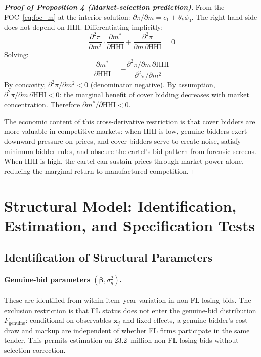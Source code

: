 \begin{proof}[\textbf{Proof of Proposition 4 (Market-selection prediction)}]
From the FOC~\eqref{eq:foc_m} at the interior solution:
$\partial \pi / \partial m = c_1 + \theta_k \phi_0$. The right-hand
side does not depend on HHI. Differentiating implicitly:
\[
  \frac{\partial^2 \pi}{\partial m^2} \cdot
  \frac{\partial m^*}{\partial \text{HHI}}
  + \frac{\partial^2 \pi}{\partial m \, \partial \text{HHI}} = 0
\]
Solving:
\[
  \frac{\partial m^*}{\partial \text{HHI}} =
  -\frac{\partial^2 \pi / \partial m \, \partial \text{HHI}}
  {\partial^2 \pi / \partial m^2}
\]
By concavity, $\partial^2 \pi / \partial m^2 < 0$ (denominator negative).
By assumption, $\partial^2 \pi / \partial m \, \partial \text{HHI} < 0$:
the marginal benefit of cover bidding decreases with market
concentration. Therefore $\partial m^* / \partial \text{HHI} < 0$.

The economic content of this cross-derivative restriction is that cover bidders
are more valuable in competitive markets: when HHI is low, genuine
bidders exert downward pressure on prices, and cover bidders serve to
create noise, satisfy minimum-bidder rules, and obscure the cartel's
bid pattern from forensic screens. When HHI is high, the cartel can
sustain prices through market power alone, reducing the marginal return
to manufactured competition.
\end{proof}


\section{Structural Model: Identification, Estimation, and Specification Tests}
\label{app:structural_id}

\subsection{Identification of Structural Parameters}

\paragraph{Genuine-bid parameters $(\boldsymbol{\beta}, \sigma_g^2)$.}
These are identified from within-item--year variation in non-FL
losing bids. The exclusion restriction is that FL status does not
enter the genuine-bid distribution $F_{\text{genuine}}$: conditional
on observables $\mathbf{x}_j$ and fixed effects, a genuine bidder's
cost draw and markup are independent of whether FL firms participate
in the same tender. This permits estimation on 23.2~million non-FL
losing bids without selection correction.

